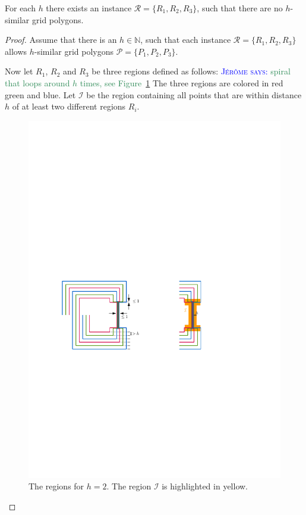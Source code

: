 \documentclass[a4paper,UKenglish,cleveref]{lipics-v2019}
\newcommand{\mremark}[3]{\textcolor{blue}{\textsc{#1 #2:}} \textcolor{SeaGreen}{\textsf{#3}}}
\newcommand{\jerome}[2][says]{\mremark{J\'er\^ome}{#1}{#2}}
\newcommand{\ixi}{\mathcal{I}}
\begin{document}
\begin{theorem}\label{thm:unbouded}
For each $h$ there exists an instance $\mathcal{R}=\{R_1, R_2, R_3\}$, such that there are no $h$-similar grid polygons.
\end{theorem}
\begin{proof}
Assume that there is an $h\in \mathbb{N}$, such that each instance $\mathcal{R}=\{R_1, R_2, R_3\}$ allows $h$-similar grid polygons $\mathcal{P}=\{P_1, P_2, P_3\}$.

Now let $R_1$, $R_2$ and $R_3$ be three regions defined as follows:
\jerome{spiral that loops around $h$ times, see Figure~\ref{fig:arbitrary-spirals}}
The three regions are colored in red green and blue.
Let $\ixi$ be the region containing all points that are within distance $h$ of at least two different regions $R_i$.

\begin{figure}
\centering
\includegraphics[scale=1]{Figures/arbitrary-lower-by-spirals.pdf}
\caption{The regions for $h=2$. The region $\ixi$ is highlighted in yellow.}
\label{fig:arbitrary-spirals}
\end{figure}


\end{proof}
\end{document}

